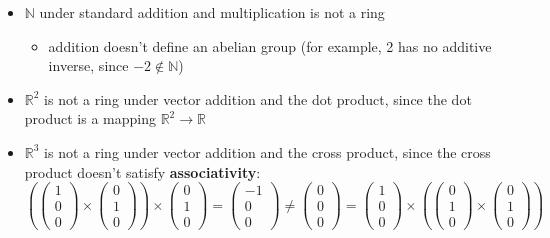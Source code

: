 \documentclass{exam}
\begin{document}
\begin{itemize}
    \item $\mathbb{N}$ under standard addition and multiplication is not a ring
    \begin{itemize}
        \item addition doesn't define an abelian group (for example, 2 has no additive inverse, since $-2 \not \in \mathbb{N}$)
    \end{itemize} 
    \item $\mathbb{R}^2$ is not a ring under vector addition and the dot product, since the dot product is a mapping $\mathbb{R}^2 \to \mathbb{R}$
    \item $\mathbb{R}^3$ is not a ring under vector addition and the cross product, since the cross product doesn't satisfy \textbf{associativity}:
    \[
    \left(
    \begin{pmatrix}
    1 \\
    0 \\
    0
    \end{pmatrix}
    \times 
    \begin{pmatrix}
    0 \\
    1 \\
    0
    \end{pmatrix}
    \right)
    \times
    \begin{pmatrix}
    0 \\
    1 \\
    0
    \end{pmatrix}
    =
    \begin{pmatrix}
    -1 \\
    0 \\
    0
    \end{pmatrix}
    \neq 
    \begin{pmatrix}
    0 \\
    0 \\
    0
    \end{pmatrix}
    =
    \begin{pmatrix}
    1 \\
    0 \\
    0
    \end{pmatrix}
    \times 
    \left(
    \begin{pmatrix}
    0 \\
    1 \\
    0
    \end{pmatrix}
    \times
    \begin{pmatrix}
    0 \\
    1 \\
    0
    \end{pmatrix}
    \right)
    \]
\end{itemize}
\end{document}
